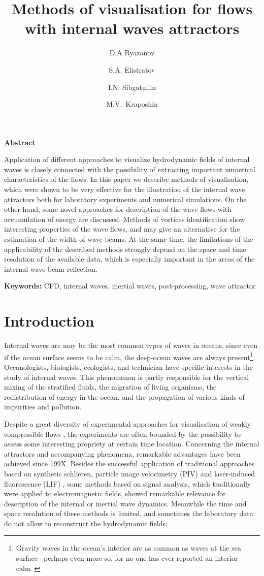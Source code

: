\documentclass[a4wide,fontsize=12pt]{article}
\title{\textbf{Methods of visualisation for flows with internal waves attractors}}
\author[1,A]{D.A Ryazanov}
\author[2,B]{S.A. Elistratov}
\author[3,C]{I.N. Sibgatullin}
\author[4,A]{M.V.~Kraposhin}
\affil[A]{Ivannikov Institute for System Programming of the RAS}
\affil[B]{Lomonosov Moscow State University}
\affil[C]{Shirshov Institute of Oceanology of Russian Academy of Sciences}
\affil[ ]{}
\affil[1]{ORCID: 0000-0001-9568-7121}
\affil[2]{ORCID: 0000-0002-7006-6879}
\affil[3]{ORCID: 0000-0003-2265-3259}
\affil[4]{ORCID: 0000-0001-5730-2702}
\date{}
\begin{document}
\maketitle

\underline{\textbf{Abstract}}

Application of different approaches to visualize hydrodynamic fields of internal waves is closely connected with the possibility of extracting important numerical characteristics of the flows. In this paper we describe methods of visualisation, which were shown to be very effective for the illustration of the internal wave attractors both for laboratory experiments and numerical simulations. On the other hand, some novel approaches for description of the wave flows with accumulation of energy are discussed. Methods of vortices identification show interesting properties of the wave flows, and may give an alternative for the estimation of the width of wave beams. At the same time, the limitations of the applicability of the described methods strongly depend on the space and time resolution of the available data, which is especially important in the areas of the internal wave beam reflection.  

\textbf{Keywords:} CFD, internal waves, inertial waves, post-processing, wave attractor

\section{Introduction}

Internal waves are may be the most common types of waves in oceans, since even if the ocean surface seems to be calm, the deep-ocean waves \cite{1966MunkAbyssalRecipes,Munk1998} are always present\footnote{Gravity waves in the ocean's interior are as common as waves at the sea surface\,--\,perhaps even more so, for no one has ever reported an interior calm~\cite{2005Munk9IW}}. Oceanologists, biologists, ecologists, and technician have specific  interests in the study of internal waves. This phenomenon is partly responsible for the vertical mixing of the stratified fluids, the migration of living organisms, the redistribution of energy in the ocean, and the propagation of various kinds of impurities and pollution.

Despite a great diversity of experimental approaches for visualisation of weakly compressible flows \cite{znamenskaya2021methods388562176,2014SutherlandDuaxoisPeacockIWinLE}, the experiments are often bounded by the possibility to assess some interesting propriety at certain time location. Concerning the internal attractors and accompanying phenomena, remarkable advantages have been achieved since 199X. Besides the successful application of traditional approaches based on synthetic schlieren, particle image velocimetry (PIV) and laser-induced fluorescence (LIF) , some methods based on signal analysis, which traditionally were applied to electromagnetic fields, showed remarkable relevance for description of the internal or inertial wave dynamics. Meanwhile the time and space resolution of these methods is limited, and sometimes the laboratory data do not allow to reconstruct the hydrodynamic fields: 
\end{document}
